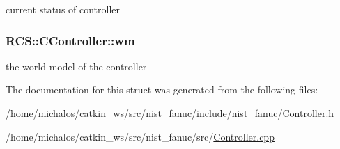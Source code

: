 current status of controller \hypertarget{structRCS_1_1CController_a2b5d355e3e9d6195943ab148c1f94083}{
\subsubsection[{wm}]{ R\-C\-S\-::\-C\-Controller\-::wm\hspace{0.3cm}{\ttfamily [static]}}}\label{structRCS_1_1CController_a2b5d355e3e9d6195943ab148c1f94083}
the world model of the controller 

The documentation for this struct was generated from the following files\-:\begin{DoxyCompactItemize}
\item 
/home/michalos/catkin\-\_\-ws/src/nist\-\_\-fanuc/include/nist\-\_\-fanuc/\hyperlink{Controller_8h}{Controller.\-h}\item 
/home/michalos/catkin\-\_\-ws/src/nist\-\_\-fanuc/src/\hyperlink{Controller_8cpp}{Controller.\-cpp}\end{DoxyCompactItemize}
